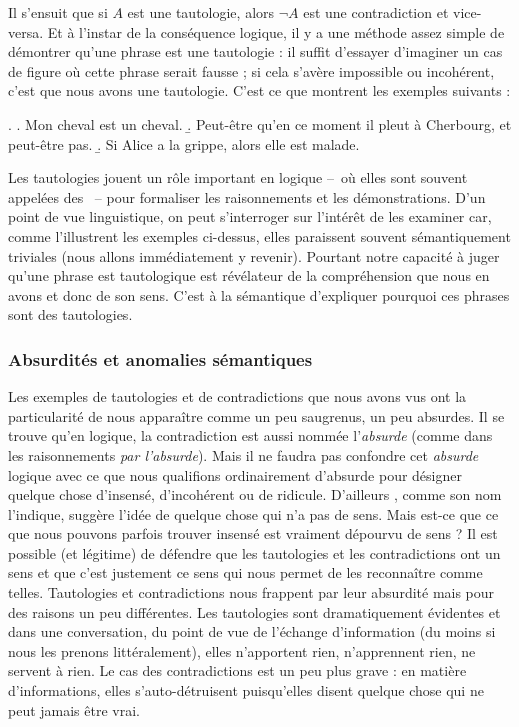 \begin{refsegment}
Il s'ensuit que si $A$ est une tautologie, alors $\neg A$ est une contradiction et vice-versa.  Et à l'instar de la conséquence logique, il y a une méthode assez simple de démontrer qu'une phrase est une tautologie : il suffit d'essayer d'imaginer un cas de figure où cette phrase serait fausse ; si cela s'avère impossible ou incohérent, c'est que nous avons une tautologie.  C'est ce que montrent les exemples suivants :

\ex.
\a. Mon cheval est un cheval.
\b. Peut-être qu'en ce moment il pleut à Cherbourg, et peut-être pas.
\b. Si Alice a la grippe, alors elle est malade.


Les tautologies jouent un rôle important en logique  --~où elles sont souvent appelées des ~-- pour formaliser les raisonnements et les démonstrations.  
D'un point de vue linguistique, on peut s'interroger sur l'intérêt de les examiner car, comme l'illustrent les exemples ci-dessus,  elles paraissent souvent sémantiquement triviales (nous allons immédiatement y revenir). 
Pourtant notre capacité à juger qu'une phrase est tautologique est révélateur de la compréhension que nous en avons et donc de son sens.  C'est à la sémantique d'expliquer pourquoi ces phrases sont des tautologies.


\subsubsection{Absurdités et anomalies sémantiques}
\label{sss:anomalies}

Les exemples de tautologies et de contradictions que nous avons vus ont la particularité de nous apparaître comme un peu saugrenus, un peu absurdes.  
Il se trouve qu'en logique, la contradiction est aussi nommée l'\emph{absurde}
(comme dans les
raisonnements \emph{par l'absurde}). 
Mais il ne faudra pas confondre cet \emph{absurde} logique avec ce que nous qualifions ordinairement d'absurde pour désigner quelque chose d'insensé, d'incohérent ou de ridicule.  D'ailleurs , comme son nom l'indique, suggère l'idée de quelque chose qui n'a pas de sens.  Mais est-ce que ce que nous pouvons parfois trouver insensé est vraiment dépourvu de sens ?  Il est possible (et légitime) de défendre que les tautologies et les contradictions ont un sens et que c'est justement ce sens qui nous permet de les reconnaître comme telles.  Tautologies et contradictions nous frappent par leur absurdité mais pour des raisons un peu différentes.  Les tautologies sont dramatiquement évidentes et dans une conversation, du point de vue de l'échange d'information (du moins si nous les prenons littéralement), elles n'apportent rien, n'apprennent rien, ne servent à rien.  Le cas des contradictions est un peu plus grave : en matière d'informations, elles s'auto-détruisent puisqu'elles disent quelque chose qui ne peut jamais être vrai. 


\end{refsegment}
